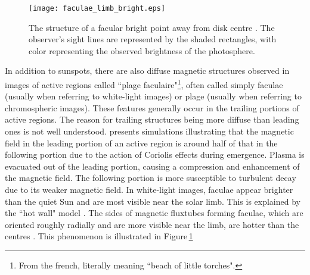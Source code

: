 
\begin{figure}[t]
\centerline{\texttt{[image: faculae\_limb\_bright.eps]}}
\caption[The structure of a facular bright point.]{The structure of a facular bright point away from disk centre \citep[from][]{Keller:2004}. The observer's sight lines are represented by the shaded rectangles, with color representing the observed brightness of the photosphere.}
\label{fig:faculaebright}
\end{figure}

In addition to sunspots, there are also diffuse magnetic structures observed in images of active regions called ``plage faculaire"\footnote{From the french, literally meaning ``beach of little torches".}, often called simply faculae (usually when referring to white-light images) or plage (usually when referring to chromospheric images). These features generally occur in the trailing portions of active regions. The reason for trailing structures being more diffuse than leading ones is not well understood. \citet{Fan:1993} presents simulations illustrating that the magnetic field in the leading portion of an active region is around half of that in the following portion due to the action of Coriolis effects during emergence. Plasma is evacuated out of the leading portion, causing a compression and enhancement of the magnetic field. The following portion is more susceptible to turbulent decay due to its weaker magnetic field.  
In white-light images, faculae appear brighter than the quiet Sun and are most visible near the solar limb. 
This is explained by the ``hot wall" model \citep{Spruit:1976}. The sides of magnetic  \glspl{fluxtube} forming faculae, which are oriented roughly radially and are more visible near the limb, are hotter than the centres \citep{Keller:2004}. This phenomenon is illustrated in Figure\,\ref{fig:faculaebright}

